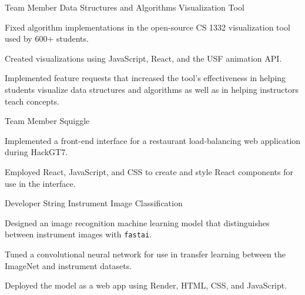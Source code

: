 \begin{cventries}

\cvproject
{Team Member} %
{Data Structures and Algorithms Visualization Tool}
{} %
{} %
{ %
\begin{cvitems}
\item Fixed algorithm implementations in the open-source CS 1332 visualization tool used by 600+ students.
\item Created visualizations using JavaScript, React, and the USF animation API.
\item Implemented feature requests that increased the tool's effectiveness
in helping students visualize data structures and algorithms
as well as in helping instructors teach concepts.
\end{cvitems}
}

\cvproject
{Team Member} %
{Squiggle} %
{} %
{} %
{ %
\begin{cvitems}
    \item Implemented a front-end interface for a restaurant load-balancing web application
    during HackGT7.
    \item Employed React, JavaScript, and CSS to 
    create and style React components for use in the interface.
\end{cvitems}
}

\cvproject
{Developer} %
{String Instrument Image Classification}
{} %
{} %
{ %
\begin{cvitems}
\item Designed an image recognition machine learning model that distinguishes between instrument images with \texttt{fastai}. 
\item Tuned a convolutional neural network for use in transfer learning between the ImageNet and instrument datasets.
\item Deployed the model as a web app using Render, HTML, CSS, and JavaScript.
\end{cvitems}
}



\end{cventries}
